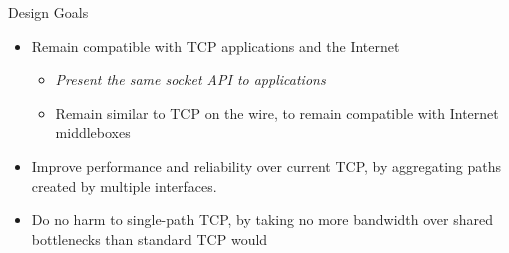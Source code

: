 \documentclass{beamer}
\begin{document}
\begin{frame}{Design Goals}

  \begin{itemize}
  \item Remain compatible with TCP applications and the Internet
    \begin{itemize}
    \item \textit{Present the same socket API to applications}
    \item Remain similar to TCP on the wire, to remain compatible with Internet
      middleboxes
    \end{itemize}
  \item Improve performance and reliability over current TCP, by aggregating
    paths created by multiple interfaces.
  \item Do no harm to single-path TCP, by taking no more bandwidth over shared
    bottlenecks than standard TCP would
  \end{itemize}
\end{frame}
\end{document}
